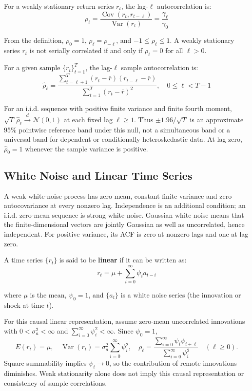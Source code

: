 \begin{definition}
For a weakly stationary return series $r_t$, the lag-$\ell$ autocorrelation is:
$$\rho_\ell = \frac{\operatorname{Cov}(r_t, r_{t-\ell})}{\operatorname{Var}(r_t)} = \frac{\gamma_\ell}{\gamma_0}$$
\end{definition}

From the definition, $\rho_0 = 1$, $\rho_\ell = \rho_{-\ell}$, and $-1 \leq \rho_\ell \leq 1$. A weakly stationary series $r_t$ is not serially correlated if and only if $\rho_\ell = 0$ for all $\ell > 0$.

For a given sample $\{r_t\}_{t=1}^T$, the lag-$\ell$ sample autocorrelation is:
$$\hat{\rho}_\ell = \frac{\sum_{t=\ell+1}^T (r_t - \bar{r})(r_{t-\ell} - \bar{r})}{\sum_{t=1}^T (r_t - \bar{r})^2}, \quad 0 \leq \ell < T - 1$$

For an i.i.d. sequence with positive finite variance and finite fourth
moment, $\sqrt T\,\hat\rho_\ell\xrightarrow{d}\mathcal N(0,1)$ at each
fixed lag $\ell\ge1$. Thus $\pm1.96/\sqrt T$ is an approximate 95\%
pointwise reference band under this null, not a simultaneous band or
a universal band for dependent or conditionally heteroskedastic data.
At lag zero, $\hat\rho_0=1$ whenever the sample variance is positive.
\subsection{White Noise and Linear Time Series}

A weak white-noise process has zero mean, constant finite variance
and zero autocovariance at every nonzero lag. Independence is an
additional condition; an i.i.d. zero-mean sequence is strong white
noise. Gaussian white noise means that the finite-dimensional vectors
are jointly Gaussian as well as uncorrelated, hence independent.
For positive variance, its ACF is zero at nonzero lags and one at lag zero.

A time series $\{r_t\}$ is said to be \textbf{linear} if it can be written as:
$$r_t = \mu + \sum_{i=0}^\infty \psi_i a_{t-i}$$

where $\mu$ is the mean, $\psi_0 = 1$, and $\{a_t\}$ is a white noise series (the innovation or shock at time $t$).

For this causal linear representation, assume zero-mean uncorrelated
innovations with $0<\sigma_a^2<\infty$ and
$\sum_{i=0}^{\infty}\psi_i^2<\infty$. Since $\psi_0=1$,
$$E(r_t)=\mu,\quad \operatorname{Var}(r_t)=\sigma_a^2\sum_{i=0}^{\infty}\psi_i^2,
\quad \rho_\ell=\frac{\sum_{i=0}^{\infty}\psi_i\psi_{i+\ell}}
{\sum_{i=0}^{\infty}\psi_i^2}\quad(\ell\ge0).$$
Square summability implies $\psi_i\to0$, so the contribution of remote
innovations diminishes. Weak stationarity alone does not imply this
causal representation or consistency of sample correlations.

